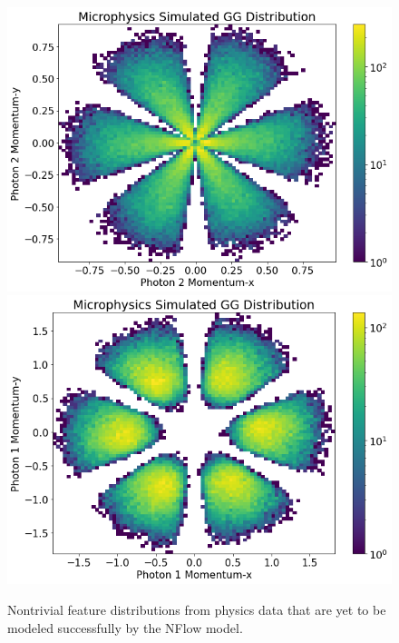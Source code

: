 \begin{figure}[!ht]
\begin{minipage}{0.4\textwidth}
        \centering
        \includegraphics[width=.9\textwidth,trim={0 0 0 .875cm},clip]{pictures/milestoneR2/pxpy/g2pxpy.png}
        \includegraphics[width=.9\textwidth,trim={0 0 0 .875cm},clip]{pictures/milestoneR2/pxpy/gpxpy.png}
    \end{minipage}
    \caption{Nontrivial feature distributions from physics data that are yet to be modeled successfully by the NFlow model.}
    \label{fig:extra}
\end{figure}

